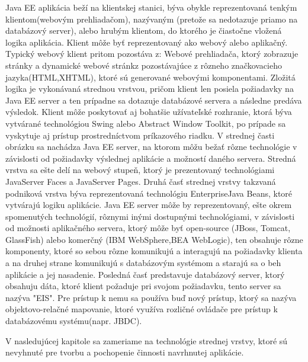 Java EE aplikácia beží na klientskej stanici, býva obykle reprezentovaná tenkým klientom(webovým prehliadačom), nazývaným (pretože sa nedotazuje priamo na databázový server), alebo hrubým klientom, do ktorého je čiastočne vložená logika aplikácia. Klient môže byť reprezentovaný ako webový alebo aplikačný. Typický webový klient pritom pozostáva z:  Webové prehliadača, ktorý zobrazuje stránky a dynamické webové stránkz pozostávajúce  z rôzneho značkovacieho jazyka(HTML,XHTML), ktoré sú generované webovými komponentami. Zložitá logika je vykonávaná strednou vrstvou, pričom klient len posiela požiadavky na Java EE server a ten prípadne sa dotazuje databázové servera a následne predáva výsledok. Klient môže poskytovať aj bohatšie užívateľské rozhranie, ktorá býva vytvárané technológiou Swing alebo Abstract Window Toolkit\cite{guibook}, po prípade sa vyskytuje aj prístup prostredníctvom príkazového riadku. V strednej časti obrázku sa nachádza Java EE server, na ktorom môžu bežať rôzne technológie v závislosti od požiadavky výslednej aplikácie a možností daného servera.  Stredná vrstva sa ešte delí na webový stupeň, ktorý je prezentovaný technológiami JavaServer Faces a JavaServer Pages. Druhá časť strednej vrstvy takzvaná podniková vrstva býva reprezentovaná technológiu EnterpriseJava Beans, ktoré vytvárajú logiku aplikácie. Java EE server môže by reprezentovaný, ešte okrem spomenutých technológií, rôznymi inými dostupnými technológiami, v závislosti od možnosti aplikačného servera, ktorý môže byť open-source (JBoss, Tomcat, GlassFish) alebo komerčný (IBM WebSphere,BEA WebLogic), ten obsahuje rôzne komponenty, ktoré so sebou rôzne komunikujú a interagujú na požiadavky klienta a na druhej strane komunikujú s databázovým systémom a starajú sa o beh aplikácie a jej nasadenie. Posledná časť predstavuje databázový server, ktorý obsahuju dáta, ktoré klient požaduje pri svojom požiadavku, tento server sa nazýva "EIS". Pre prístup k nemu sa používa buď nový prístup, ktorý sa nazýva objektovo-relačné mapovanie, ktoré využíva rozličné ovládače pre prístup k databázovému systému(napr. JBDC).

V nasledujúcej kapitole sa zameriame na technológie strednej vrstvy, ktoré sú nevyhnuté pre tvorbu a pochopenie činnosti navrhnutej aplikácie.


